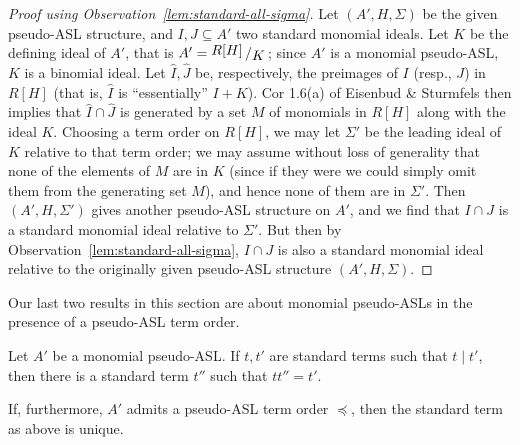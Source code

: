 \documentclass[11pt,reqno]{amsart}
\newcommand{\bigslant}[2]{{\raisebox{.2em}{$#1$}\left/\raisebox{-.2em}{$#2$}\right.}}
\theoremstyle{definition}
\numberwithin{equation}{section}
\begin{document}
\begin{proof}[Proof using Observation~\ref{lem:standard-all-sigma}]
Let $(A',H,\Sigma)$ be the given pseudo-ASL structure, and $I,J \subseteq A'$ two standard monomial ideals. Let $K$ be the defining ideal of $A'$, that is $A' = \bigslant{R[H]}{K}$; since $A'$ is a monomial pseudo-ASL, $K$ is a binomial ideal. Let $\hat{I}, \hat{J}$ be, respectively, the preimages of $I$ (resp., $J$) in $R[H]$ (that is, $\hat{I}$ is ``essentially'' $I+K$). Cor 1.6(a) of Eisenbud \& Sturmfels \cite{ES} then implies that $\hat{I} \cap \hat{J}$ is generated by a set $M$ of monomials in $R[H]$ along with the ideal $K$. Choosing a term order on $R[H]$, we may let $\Sigma'$ be the leading ideal of $K$ relative to that term order; we may assume without loss of generality that none of the elements of $M$ are in $K$ (since if they were we could simply omit them from the generating set $M$), and hence none of them are in $\Sigma'$. Then $(A',H,\Sigma')$ gives another pseudo-ASL structure on $A'$, and we find that $I \cap J$ is a standard monomial ideal relative to $\Sigma'$. But then by Observation~\ref{lem:standard-all-sigma}, $I \cap J$ is also a standard monomial ideal relative to the originally given pseudo-ASL structure $(A',H,\Sigma)$.
\end{proof}

Our last two results in this section are about monomial pseudo-ASLs in the presence of a pseudo-ASL term order.

\begin{lemma} \label{lem:mon-div}
Let $A'$ be a monomial pseudo-ASL. If $t,t'$ are standard terms such that $t \mid t'$, then there is a standard term $t''$ such that $tt'' = t'$.

If, furthermore, $A'$ admits a pseudo-ASL term order $\preceq$, then the standard term as above is unique.
\end{lemma}
\end{document}
